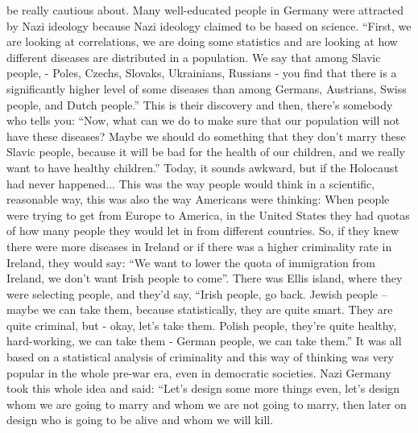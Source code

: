 be really cautious about. Many well-educated people in Germany were attracted by Nazi ideology because Nazi ideology claimed to be based on science. ``First, we are  looking at correlations, we are doing some statistics and are looking at how different diseases are distributed in a population. We say that among Slavic people, - Poles, Czechs, Slovaks, Ukrainians, Russians - you find that there is a significantly higher level of some diseases than among Germans, Austrians, Swiss people, and Dutch people.'' This is their discovery and then, there’s somebody who tells you: ``Now, what can we do to make sure that our population will not have these diseases? Maybe we should do something that they don’t marry these Slavic people, because it will be bad for the health of our children, and we really want to have healthy children.'' Today, it sounds awkward, but if the Holocaust had never happened... This was the way people would think in a scientific, reasonable way, this was also the way Americans were thinking: When people were trying to get from Europe to America, in the United States they had quotas of how many people they would let in from different countries. So, if they knew there were more diseases in Ireland or if there was a higher criminality rate in Ireland, they would say: ``We want to lower the quota of immigration from Ireland, we don’t want Irish people to come''. There was Ellis island, where they were selecting people, and they’d say, ``Irish people, go back. Jewish people – maybe we can take them, because statistically, they are quite smart. They are quite criminal, but - okay, let’s take them. Polish people, they’re quite healthy, hard-working, we can take them - German people, we can take them.'' It was all based on a statistical analysis of criminality and this way of thinking was very popular in the whole pre-war era, even in democratic societies. Nazi Germany took this whole idea and said: ``Let’s design some more things even, let’s design whom we are going to marry and whom we are not going to marry, then later on design who is going to be alive and whom we will kill.\\
